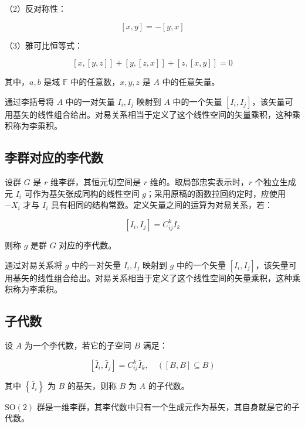 （2）反对称性：

\begin{equation}
\left[x,y \right]=-\left[y,x \right]
\end{equation}

（3）雅可比恒等式：

\begin{equation}
\left[x,\left[y,z \right] \right] + \left[y,\left[z,x \right]  \right] + \left[z,\left[x,y \right] \right]
=0
\end{equation}

其中，$a,b$ 是域 $\mathbb{F}$ 中的任意数，$x,y,z$ 是 $A$ 中的任意矢量。

通过李括号将 $A$ 中的一对矢量 $I_i,I_j$ 映射到 $A$ 中的一个矢量 $\left[I_i,I_j \right]$，该矢量可用基矢的线性组合给出。对易关系相当于定义了这个线性空间的矢量乘积，这种乘积称为李乘积。

\subsection{李群对应的李代数}

设群 $G$ 是 $r$ 维李群，其恒元切空间是 $r$ 维的。取局部忠实表示时，$r$ 个独立生成元 $I_i$ 可作为基矢张成同构的线性空间 $g$；采用原稿的函数拉回约定时，应使用 $-X_i$ 才与 $I_i$ 具有相同的结构常数。定义矢量之间的运算为对易关系，若：

\begin{equation}
\left[I_i,I_j \right] = C_{ij}^k I_k
\end{equation}

则称 $g$ 是群 $G$ 对应的李代数。

通过对易关系将 $g$ 中的一对矢量 $I_i,I_j$ 映射到 $g$ 中的一个矢量 $\left[I_i,I_j \right]$，该矢量可用基矢的线性组合给出。对易关系相当于定义了这个线性空间的矢量乘积，这种乘积称为李乘积。

\subsection{子代数}

设 $A$ 为一个李代数，若它的子空间 $B$ 满足：

\begin{equation}
\left[\bar{I}_i , \bar{I}_j \right] = C_{ij}^k \bar{I}_k,\quad \left(\left[B,B \right]\subseteq B \right)
\end{equation}

其中 $\left\{\bar{I}_i \right\}$ 为 $B$ 的基矢，则称 $B$ 为 $A$ 的子代数。

$\mathrm{SO}\left(2\right)$ 群是一维李群，其李代数中只有一个生成元作为基矢，其自身就是它的子代数。

